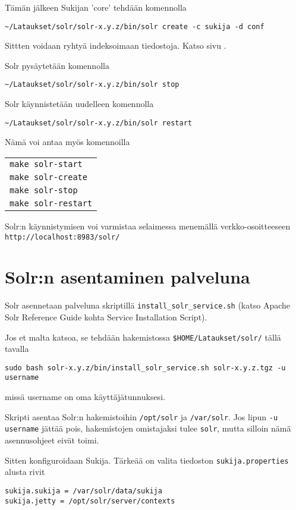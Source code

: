 \documentclass[12pt]{article}
\begin{document}
Tämän jälkeen Sukijan 'core' tehdään komennolla

\verb|~/Lataukset/solr/solr-x.y.z/bin/solr create -c sukija -d conf|

Sittten voidaan ryhtyä indeksoimaan tiedostoja. Katso sivu
.


Solr pysäytetään komennolla

\verb|~/Lataukset/solr/solr-x.y.z/bin/solr stop|

Solr käynnistetään uudelleen komennolla

\verb|~/Lataukset/solr/solr-x.y.z/bin/solr restart|


Nämä voi antaa myös komennoilla

\begin{tabular}{@{}l}
\verb|make solr-start| \\
\verb|make solr-create| \\
\verb|make solr-stop| \\
\verb|make solr-restart|
\end{tabular}

Solr:n käynnistymisen voi varmistaa selaimessa menemällä
verkko-osoitteeseen
\verb|http://localhost:8983/solr/|



\section*{Solr:n asentaminen palveluna}

Solr asennetaan palveluna skriptillä
\verb=install_solr_service.sh= 
(katso Apache Solr Reference Guide
kohta Service Installation Script).

Jos et malta katsoa, se tehdään hakemistossa
\verb=$HOME/Lataukset/solr/= tällä tavalla

{\footnotesize
\verb=sudo bash solr-x.y.z/bin/install_solr_service.sh solr-x.y.z.tgz -u username=
}

missä username on oma käyttäjätunnuksesi.

Skripti asentaa Solr:n hakemistoihin \verb=/opt/solr= ja
\verb=/var/solr=. Jos lipun \verb=-u username= jättää pois,
hakemistojen omistajaksi tulee \verb=solr=, mutta silloin nämä
asennusohjeet eivät toimi.

Sitten konfiguroidaan Sukija. Tärkeää on valita tiedoston
\verb=sukija.properties= alusta rivit

\begin{verbatim}
sukija.sukija = /var/solr/data/sukija
sukija.jetty = /opt/solr/server/contexts
\end{verbatim}
\end{document}
